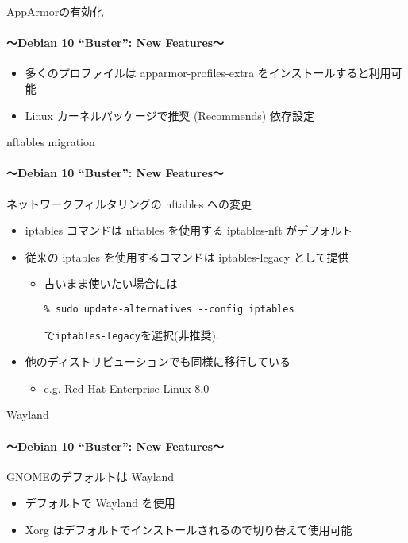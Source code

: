 \documentclass[cjk,c,squeeze,shrink,dvipdfmx,12pt,handout]{beamer}
\begin{document}
\begin{frame}[fragile]{AppArmorの有効化}
  \framesubtitle{〜Debian 10 ``Buster'': New Features〜}
  \begin{itemize}
  \item %
    多くのプロファイルは apparmor-profiles-extra をインストールすると利用可能
  \item %
    Linux カーネルパッケージで推奨 (Recommends) 依存設定
  \end{itemize}
\end{frame}

\begin{frame}[fragile]{nftables migration}
  \framesubtitle{〜Debian 10 ``Buster'': New Features〜}

  ネットワークフィルタリングの nftables への変更
  \begin{itemize}
  \item iptables コマンドは nftables を使用する iptables-nft がデフォルト
  \item 従来の iptables を使用するコマンドは iptables-legacy として提供
    \begin{itemize}
    \item %
      古いまま使いたい場合には
\begin{verbatim}
% sudo update-alternatives --config iptables
\end{verbatim}
      で\texttt{iptables-legacy}を選択(非推奨).
    \end{itemize}
  \item 他のディストリビューションでも同様に移行している
    \begin{itemize}
    \item %
      e.g. Red Hat Enterprise Linux 8.0
    \end{itemize}
  \end{itemize}
\end{frame}

\begin{frame}[fragile]{Wayland}
  \framesubtitle{〜Debian 10 ``Buster'': New Features〜}

  GNOMEのデフォルトは Wayland
  \begin{itemize}
  \item デフォルトで Wayland を使用
  \item Xorg はデフォルトでインストールされるので切り替えて使用可能
  \end{itemize}
\end{frame}
\end{document}
